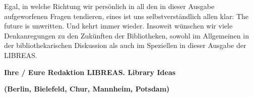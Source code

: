 \documentclass[a4paper,
fontsize=11pt,
oneside,
numbers=noperiodatend,
parskip=half-,
bibliography=totoc,
final
]{scrartcl}
\begin{document}
Egal, in welche Richtung wir persönlich in all den in dieser Ausgabe
aufgeworfenen Fragen tendieren, eines ist uns selbstverständlich allen
klar: The future is unwritten. Und kehrt immer wieder. Insoweit wünschen
wir viele Denkanregungen zu den Zukünften der Bibliotheken, sowohl im
Allgemeinen in der bibliothekarischen Diskussion als auch im Speziellen
in dieser Ausgabe der LIBREAS.

\textbf{Ihre / Eure Redaktion LIBREAS. Library Ideas}

\textbf{(Berlin, Bielefeld, Chur, Mannheim, Potsdam)}

\end{document}
